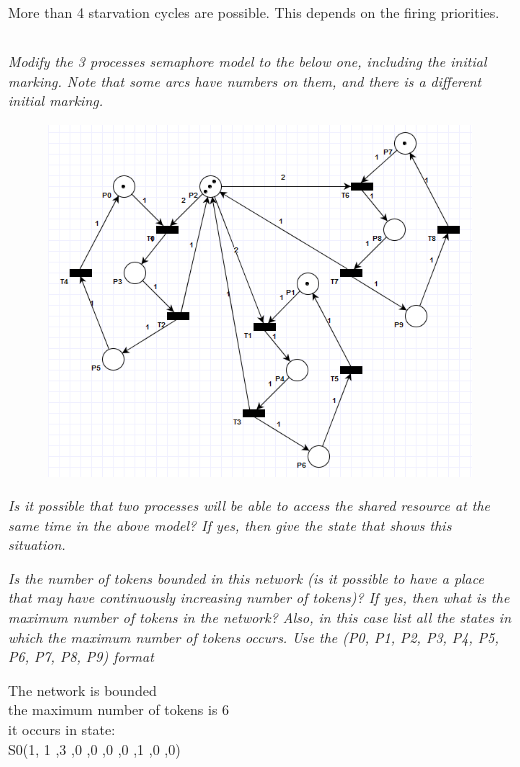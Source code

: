 \documentclass[letterpaper]{article}
\begin{document}
More than 4 starvation cycles are possible.
This depends on the firing priorities.




\subsection{}
\textit{Modify the 3 processes semaphore model to the below one, including the initial marking.
 Note that some arcs have numbers on them, and there is a different initial marking.
}

\begin{figure}[H]
 \centering
 \includegraphics[width=\textwidth]{image5.png}
\end{figure}

\textit{Is it possible that two processes will be able to access the shared resource at the same time in the above model? If yes, then give the state that shows this situation.}


\vspace{2cm}
\textit{Is the number of tokens bounded in this network (is it possible to have a place that may have continuously increasing number of tokens)? If yes, then what is the maximum number of tokens in the network? Also, in this case list all the states in which the maximum number of tokens occurs.
 Use the (P0, P1, P2, P3, P4, P5, P6, P7, P8, P9) format
}

The network is bounded\\
the maximum number of tokens is 6\\
it occurs in state:\\
S0(1, 1 ,3 ,0 ,0 ,0 ,0 ,1 ,0 ,0)
\end{document}
